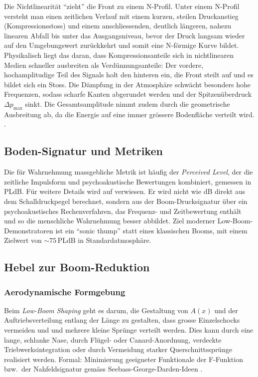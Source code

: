 Die Nichtlinearität ``zieht'' die Front zu einem N-Profil.
Unter einem N-Profil versteht man einen zeitlichen Verlauf mit einem kurzen,
steilen Druckanstieg (Kompressionsstoss) und einem anschliessenden, deutlich
längeren, nahezu linearen Abfall bis unter das Ausgangsniveau, bevor der
Druck langsam wieder auf den Umgebungswert zurückkehrt und somit eine
N-förmige Kurve bildet.
Physikalisch liegt das daran, dass Kompressionsanteile sich in nichtlinearen
Medien schneller ausbreiten als Verdünnungsanteile: Der vordere,
hochamplitudige Teil des Signals holt den hinteren ein, die Front steilt
auf und es bildet sich ein Stoss.
Die Dämpfung in der Atmosphäre schwächt besonders hohe Frequenzen,
sodass scharfe Kanten abgerundet werden und der Spitzenüberdruck
\(\Delta p_\mathrm{max}\) sinkt.
Die Gesamtsamplitude nimmt zudem durch die geometrische Ausbreitung ab, da
die Energie auf eine immer grössere Bodenfläche verteilt wird.
\cite{schall:rallabhandi2023,schall:burgersJASA}.

\subsection{Boden-Signatur und Metriken}
Die für Wahrnehmung massgebliche Metrik ist häufig der \textit{Perceived Level},
%
der die zeitliche Impulsform und psychoakustische Bewertungen kombiniert,
gemessen in PLdB. Für weitere Details wird auf \cite{schall:x59pldb} verwiesen.
Er wird nicht wie dB direkt aus dem Schalldruckpegel berechnet,
sondern aus der Boom-Drucksignatur über ein psychoakustisches Rechenverfahren,
das Frequenz- und Zeitbewertung enthält und so die menschliche
Wahrnehmung besser abbildet.
Ziel moderner Low-Boom-Demonstratoren ist ein ``sonic thump'' statt
eines klassischen Booms, mit einem Zielwert von
${\sim}75\,\text{PLdB}$ in Standardatmosphäre.
%

\subsection{Hebel zur Boom-Reduktion}
\subsubsection{Aerodynamische Formgebung}
Beim \emph{Low-Boom Shaping} geht es darum, die Gestaltung von $A(x)$ und
%
der Auftriebsverteilung entlang der Länge zu gestalten, dass
grosse Einzelschocks vermeiden und und mehrere kleine Sprünge verteilt werden.
Dies kann durch eine lange, schlanke Nase, durch Flügel- oder Canard-Anordnung,
verdeckte Triebwerksintegration oder durch Vermeidung starker
Querschnittssprünge realisiert werden.
Formal: Minimierung geeigneter Funktionale der F-Funktion bzw.~der Nahfeldsignatur
gemäss Seebass-George-Darden-Ideen \cite{schall:seebassgeorge,schall:darden75}.

